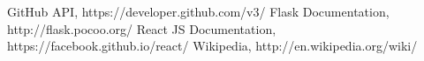 \begin{thebibliography}{9}
\bibitem{} GitHub API, https://developer.github.com/v3/
\bibitem{} Flask Documentation, http://flask.pocoo.org/
\bibitem{} React JS Documentation, https://facebook.github.io/react/
\bibitem{} Wikipedia, http://en.wikipedia.org/wiki/
\end{thebibliography}
